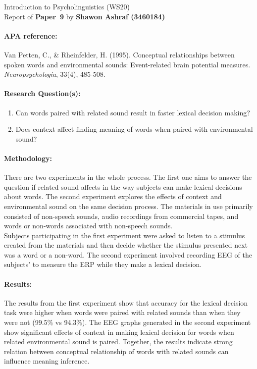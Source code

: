 \documentclass[12pt]{report}
\newcommand{\student}[3]{\begin{tcolorbox}\noindent Introduction to
    Psycholinguistics (WS20) \\ Report of \textbf{Paper~#3} by
    \textbf{#1 (#2)} 
  \end{tcolorbox}}
\begin{document}
\student{Shawon Ashraf}{3460184}{9}


\paragraph{APA reference:} Van Petten, C., & Rheinfelder, H. (1995). Conceptual relationships between spoken words and environmental sounds: Event-related brain potential measures. \textit{Neuropsychologia}, 33(4), 485-508.

\paragraph{Research Question(s):}
\begin{enumerate}
    \item Can words paired with related sound result in faster lexical decision making?
    \item Does context affect finding meaning of words when paired with environmental sound?
\end{enumerate}
\vfill
\paragraph{Methodology:}
There are two experiments in the whole process. The first one aims to answer the question if related sound affects in the way subjects can make lexical decisions about words. The second experiment explores the effects of context and environmental sound on the same decision process. The materials in use primarily consisted of non-speech sounds, audio recordings from commercial tapes, and words or non-words associated with non-speech sounds. \\
\noindent
Subjects participating in the first experiment were asked to listen to a stimulus created from the materials and then decide whether the stimulus presented next was a word or a non-word. The second experiment involved recording EEG of the subjects' to measure the ERP while they make a lexical decision.
\vfill

\paragraph{Results:}
The results from the first experiment show that accuracy for the lexical decision task were higher when words were paired with related sounds than when they were not (99.5\% vs 94.3\%). The EEG graphs generated in the second experiment show significant effects of context in making lexical decision for words when related environmental sound is paired. Together, the results indicate strong relation between conceptual relationship of words with related sounds can influence meaning inference.
\vfill
\end{document}
